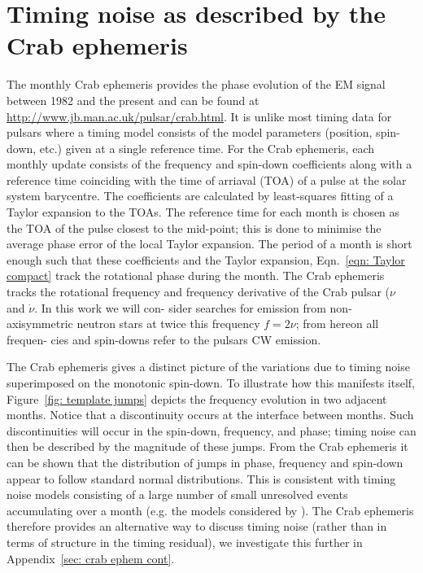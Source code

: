 \documentclass[../full_thesis/full_thesis.tex]{subfiles}
\begin{document}
\section{Timing noise as described by the Crab ephemeris}
\label{sec: timing noise as described by the crab ephemeris}
The monthly Crab ephemeris \citep{Lyne1993} provides the phase evolution of the
EM signal between 1982 and the present and can be found at
\url{http://www.jb.man.ac.uk/pulsar/crab.html}. It is unlike most timing data
for pulsars where a timing model consists of the model parameters (position,
spin-down, etc.) given at a single reference time.  For the Crab ephemeris,
each monthly update consists of the frequency and spin-down coefficients along
with a reference time coinciding with the time of arriaval (TOA) of a pulse at
the solar system barycentre. The coefficients are calculated by  least-squares
fitting of a Taylor expansion to the TOAs. The reference time for each month is
chosen as the TOA of the pulse closest to the mid-point; this is done to
minimise the average phase error of the local Taylor expansion.  The period of
a month is short enough such that these coefficients and the Taylor
expansion, Eqn.~\eqref{eqn: Taylor compact} track the rotational phase during
the month. The Crab ephemeris tracks
the rotational frequency and frequency derivative of the Crab pulsar ($\nu$ and
$\dot{\nu}$. In this work we will con- sider searches for emission from
non-axisymmetric neutron stars at twice this frequency $f = 2\nu$; from hereon
all frequen- cies and spin-downs refer to the pulsars CW emission.

The Crab ephemeris gives a distinct picture of the variations due to timing
noise superimposed on the monotonic spin-down. To illustrate how this manifests
itself, Figure~\ref{fig: template jumps} depicts the frequency evolution in two
adjacent months. Notice that a discontinuity occurs at the interface between
months.  Such discontinuities will occur in the spin-down, frequency, and
phase; timing noise can then be described by the magnitude of these jumps.
From the Crab ephemeris it can be shown that the distribution of jumps in
phase, frequency and spin-down appear to follow standard normal distributions.
This is consistent with timing noise models consisting of a large number of
small unresolved events accumulating over a month (e.g. the models considered
by \citet{Cordes1981}). The Crab ephemeris therefore provides an alternative
way to discuss timing noise (rather than in terms of structure in the timing
residual), we investigate this further in Appendix~\ref{sec: crab ephem cont}.
\end{document}
